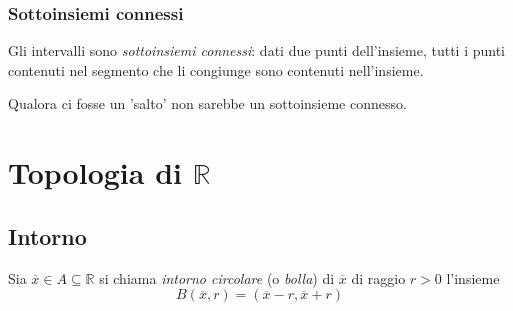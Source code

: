 \documentclass[a4paper,12pt, oneside]{book}
\begin{document}
\subsubsection{Sottoinsiemi connessi}
Gli intervalli sono \textit{sottoinsiemi connessi}: dati due punti dell'insieme, tutti i punti contenuti nel segmento che li congiunge sono contenuti nell'insieme.
\begin{osservazione}
	Qualora ci fosse un 'salto' non sarebbe un sottoinsieme connesso.
\end{osservazione}
\section{Topologia di $\mathbb{R}$}
\subsection{Intorno}
\begin{definizione}
	Sia $\overline{x} \in A \subseteq \mathbb{R}$ si chiama \emph{intorno circolare} (o \emph{bolla}) di $\overline{x}$ di raggio $r > 0$ l'insieme
	\begin{equation}
		B(\overline{x},r)= (\overline{x} - r, \overline{x} + r)
	\end{equation}
\end{definizione}
\end{document}
